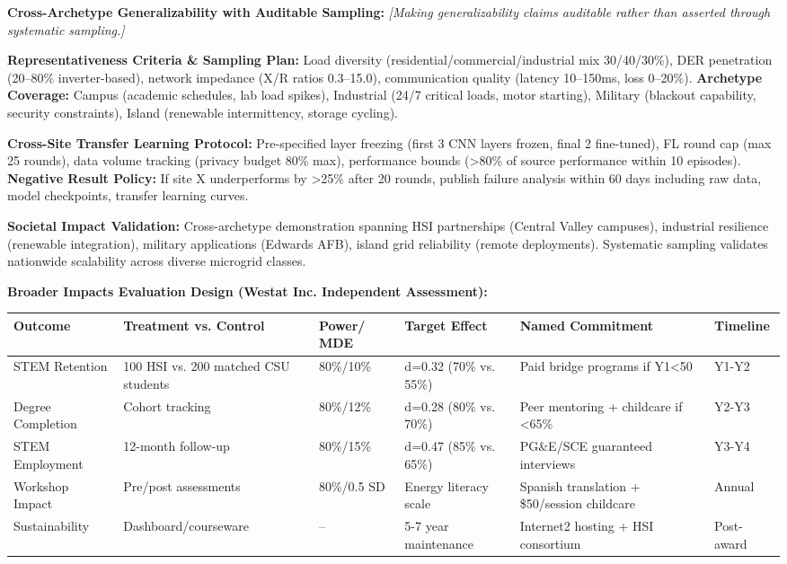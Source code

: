 \documentclass[12pt]{article}
\begin{document}
\textbf{Cross-Archetype Generalizability with Auditable Sampling:} \textit{[Making generalizability claims auditable rather than asserted through systematic sampling.]} 

\textbf{Representativeness Criteria \& Sampling Plan:} Load diversity (residential/commercial/industrial mix 30/40/30\%), DER penetration (20--80\% inverter-based), network impedance (X/R ratios 0.3--15.0), communication quality (latency 10--150ms, loss 0--20\%). \textbf{Archetype Coverage:} Campus (academic schedules, lab load spikes), Industrial (24/7 critical loads, motor starting), Military (blackout capability, security constraints), Island (renewable intermittency, storage cycling).

\textbf{Cross-Site Transfer Learning Protocol:} Pre-specified layer freezing (first 3 CNN layers frozen, final 2 fine-tuned), FL round cap (max 25 rounds), data volume tracking (privacy budget 80\% max), performance bounds (>80\% of source performance within 10 episodes). \textbf{Negative Result Policy:} If site X underperforms by >25\% after 20 rounds, publish failure analysis within 60 days including raw data, model checkpoints, transfer learning curves.

\textbf{Societal Impact Validation:} Cross-archetype demonstration spanning HSI partnerships (Central Valley campuses), industrial resilience (renewable integration), military applications (Edwards AFB), island grid reliability (remote deployments). Systematic sampling validates nationwide scalability across diverse microgrid classes.

\textbf{Broader Impacts Evaluation Design (Westat Inc. Independent Assessment):}

\begin{center}
\footnotesize
\begin{tabular}{|p{2.5cm}|p{2cm}|p{1.5cm}|p{1.5cm}|p{2cm}|p{1.5cm}|}
\hline
\textbf{Outcome} & \textbf{Treatment vs. Control} & \textbf{Power/ MDE} & \textbf{Target Effect} & \textbf{Named Commitment} & \textbf{Timeline} \\
\hline
STEM Retention & 100 HSI vs. 200 matched CSU students & 80\%/10\% & d=0.32 (70\% vs. 55\%) & Paid bridge programs if Y1<50 & Y1-Y2 \\
\hline
Degree Completion & Cohort tracking & 80\%/12\% & d=0.28 (80\% vs. 70\%) & Peer mentoring + childcare if <65\% & Y2-Y3 \\
\hline
STEM Employment & 12-month follow-up & 80\%/15\% & d=0.47 (85\% vs. 65\%) & PG\&E/SCE guaranteed interviews & Y3-Y4 \\
\hline
Workshop Impact & Pre/post assessments & 80\%/0.5 SD & Energy literacy scale & Spanish translation + \$50/session childcare & Annual \\
\hline
Sustainability & Dashboard/courseware & -- & 5-7 year maintenance & Internet2 hosting + HSI consortium & Post-award \\
\hline
\end{tabular}
\end{center}
\normalsize
\end{document}
